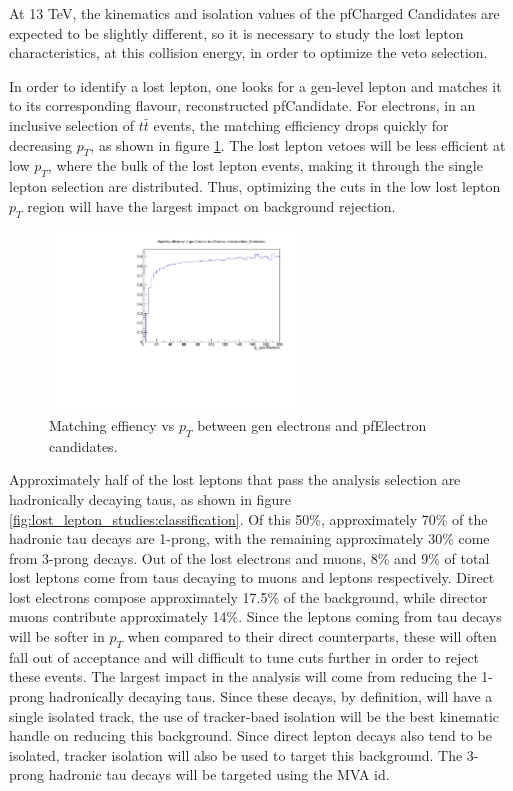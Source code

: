 At 13 TeV, the kinematics and isolation values of the pfCharged Candidates are expected to be slightly different, so it is necessary to study the lost lepton characteristics, at this collision energy, in order to optimize the veto selection. 

In order to identify a lost lepton, one looks for a gen-level lepton and matches it to its corresponding flavour, reconstructed pfCandidate.  For electrons, in an inclusive selection of $t\bar{t}$ events, the matching efficiency drops quickly for decreasing $p_{T}$, as shown in figure \ref{fig:lost_lepton_studies:el_gen_matching_eff}.  The lost lepton vetoes will be less efficient at low $p_{T}$, where the bulk of the lost lepton events, making it through the single lepton selection are distributed.  Thus, optimizing the cuts in the low lost lepton $p_{T}$ region will have the largest impact on background rejection.  

\begin{figure}[ht]
\centering
\includegraphics[width=0.60\textwidth]{Figures/studiesLostLepton/matchEff_genEl_to_pfEl_incl.pdf}
\caption{\label{fig:lost_lepton_studies:el_gen_matching_eff} Matching effiency vs $p_{T}$ between gen electrons and pfElectron candidates. }
\end{figure}

Approximately half of the lost leptons that pass the analysis selection are hadronically decaying taus, as shown in figure \ref{fig:lost_lepton_studies:classification}.  Of this 50\%, approximately 70\% of the hadronic tau decays are 1-prong, with the remaining approximately 30\% come from 3-prong decays.  Out of the lost electrons and muons, 8\% and 9\% of total lost leptons come from taus decaying to muons and leptons respectively.  Direct lost electrons compose approximately 17.5\% of the background, while director muons contribute approximately 14\%.  Since the leptons coming from tau decays will be softer in $p_{T}$ when compared to their direct counterparts, these will often fall out of acceptance and will difficult to tune cuts further in order to reject these events.  The largest impact in the analysis will come from reducing the 1-prong hadronically decaying taus.  Since these decays, by definition, will have a single isolated track, the use of tracker-baed isolation will be the best kinematic handle on reducing this background.  Since direct lepton decays also tend to be isolated, tracker isolation will also be used to target this background.  The 3-prong hadronic tau decays will be targeted using the MVA id.  

